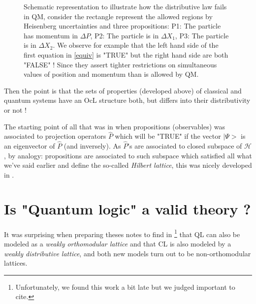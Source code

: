 \documentclass[12pt]{article}
\begin{document}
\begin{figure}[ht!]
\centering
{}

\caption{{\footnotesize Schematic representation to illustrate how the distributive law fails in QM, consider the rectangle represent the allowed regions by Heisenberg uncertainties and three propositions: P1: The particle has momentum in $\Delta P$, P2: The particle is in $\Delta X_1$, P3: The particle is in $\Delta X_2$. We observe for example that the left hand side of the first equation in \eqref{equiv} is "TRUE" but the right hand side are both "FALSE" ! Since they assert tighter restrictions on simultaneous values of position and momentum than is allowed by QM.}}\label{fig1}
\end{figure}

Then the point is that the sets of properties (developed above) of classical and quantum systems have an OcL structure both, but differs into their distributivity or not ! 

The starting point of all that was in \cite{Birkhoff} when propositions (observables) was associated to projection operators \textbf{$\hat{P}$} which will be "TRUE" if the vector $|\Psi>$ is an eigenvector of \textbf{$\hat{P}$} (and inversely). As \textbf{$\hat{P}$}'s are associated to closed subspace of $\mathcal{H}$, by analogy: propositions are associated to such subspace which satisfied all what we've said earlier and define the so-called \textit{Hilbert lattice}, this was nicely developed in \cite{david}.


\vspace{-0.3cm}
\section{Is "Quantum logic" a valid theory ?}
\vspace{-0.2cm}

It was surprising when preparing theses notes to find in \cite{pavicic1999non}\footnote{Unfortunately, we found this work a bit late but we judged important to cite.} that QL can also be modeled as a \textit{weakly orthomodular lattice} and that CL is also modeled by a \textit{weakly distributive lattice}, and both new models turn out to be non-orthomodular lattices. 
\end{document}
